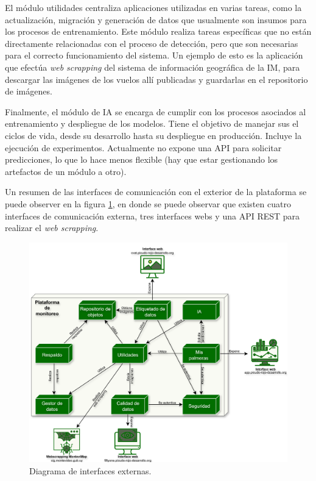 El módulo utilidades centraliza aplicaciones utilizadas en varias tareas, como la actualización, migración y generación de datos que usualmente son insumos para los procesos de entrenamiento. Este módulo realiza tareas específicas que no están directamente relacionadas con el proceso de detección, pero que son necesarias para el correcto funcionamiento del sistema. Un ejemplo de esto es la aplicación que efectúa \textit{web scrapping} del sistema de información geográfica de la IM, para descargar las imágenes de los vuelos allí publicadas y guardarlas en el repositorio de imágenes.

Finalmente, el módulo de IA se encarga de cumplir con los procesos asociados al entrenamiento y despliegue de los modelos. Tiene el objetivo de manejar sus el ciclos de vida, desde su desarrollo hasta su despliegue en producción. Incluye la ejecución de experimentos. Actualmente no expone una API para solicitar predicciones, lo que lo hace menos flexible (hay que estar gestionando los artefactos de un módulo a otro).

Un resumen de las interfaces de comunicación con el exterior de la plataforma se puede observer en la figura \ref{fig:interfaces-externas}, en donde se puede observar que existen cuatro interfaces de comunicación externa, tres interfaces webs y una API REST para realizar el \textit{web scrapping}.

\begin{figure}[H]
  \centering
  \includegraphics[scale=0.115]{./Figures/diagrama_de_bloques_interfaces_externas.png}
  \caption{Diagrama de interfaces externas.}
  \label{fig:interfaces-externas}
\end{figure}

